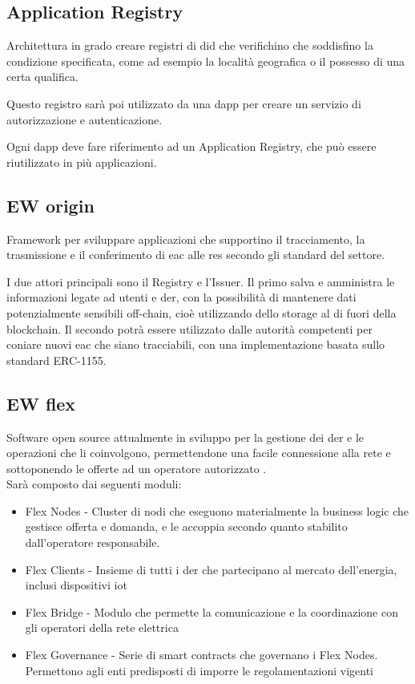 \subsection{Application Registry}
Architettura in grado creare registri di \gls{did} che verifichino che soddisfino la condizione specificata, come ad esempio la località geografica o il possesso di una certa qualifica.

Questo registro sarà poi utilizzato da una \gls{dapp} per creare un servizio di autorizzazione e autenticazione. 

Ogni \gls{dapp} deve fare riferimento ad un Application Registry, che può essere riutilizzato in più applicazioni.

\subsection{EW origin}
Framework per sviluppare applicazioni che supportino il tracciamento, la trasmissione e il conferimento di \gls{eac} alle \gls{res} secondo gli standard del settore. 

I due attori principali sono il Registry e l'Issuer. 
Il primo salva e amministra le informazioni legate ad utenti e \gls{der}, con la possibilità di mantenere dati potenzialmente sensibili off-chain, cioè utilizzando dello storage al di fuori della blockchain.
Il secondo potrà essere utilizzato dalle autorità competenti per coniare nuovi \gls{eac} che siano tracciabili, con una implementazione basata sullo standard ERC-1155.

\subsection{EW flex}
Software open source attualmente in sviluppo per la gestione dei \gls{der} e le operazioni che li coinvolgono, 
permettendone una facile connessione alla rete e sottoponendo le offerte ad un operatore autorizzato \cite{art:ew-dos}. \\

Sarà composto dai seguenti moduli:

\begin{itemize}
    \item Flex Nodes - Cluster di nodi che eseguono materialmente la business logic che gestisce offerta e domanda, e le accoppia secondo quanto stabilito dall'operatore responsabile.
    \item Flex Clients - Insieme di tutti i \gls{der} che partecipano al mercato dell'energia, inclusi dispositivi \gls{iot}
    \item Flex Bridge - Modulo che permette la comunicazione e la coordinazione con gli operatori della rete elettrica
    \item Flex Governance - Serie di smart contracts che governano i Flex Nodes. Permettono agli enti predisposti di imporre le regolamentazioni vigenti
\end{itemize}